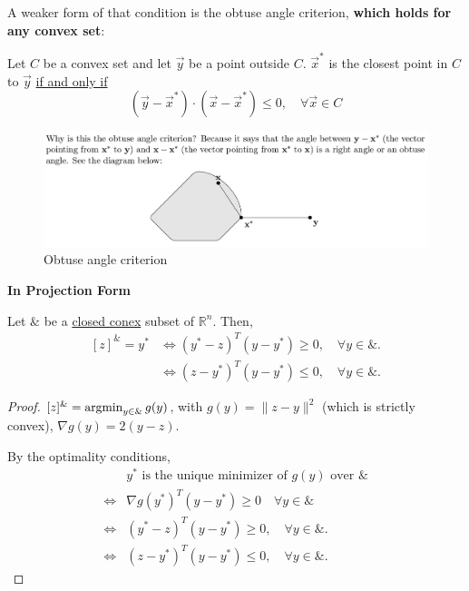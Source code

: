 \documentclass[11pt]{elegantbook}
\newcommand{\argmin}{\operatornamewithlimits{argmin}}
\begin{document}
A weaker form of that condition is the obtuse angle criterion, \textbf{which holds for any convex set}:
\begin{theorem}
    Let $C$ be a convex set and let $\vec{y}$ be a point outside $C$. $\vec{x}^*$ is the closest point in $C$ to $\vec{y}$ \underline{if and only if} $$(\vec{y}-\vec{x}^*)\cdot (\vec{x}-\vec{x}^*)\leq 0,\quad \forall \vec{x}\in C$$
\end{theorem}
\begin{center}\begin{figure}[htbp]
    \centering
    \includegraphics[scale=0.25]{obtuse.png}
    \caption{Obtuse angle criterion}
    \label{}
\end{figure}\end{center}
\textbf{In Projection Form}
\begin{proposition}
    Let $\&$ be a \underline{closed conex} subset of $\mathbb{R}^n$. Then,
    \begin{equation}
        \begin{aligned}
            [z]^\&=y^*
            &\Leftrightarrow (y^*-z)^T(y-y^*)\geq 0,\quad \forall y\in\&.\\
            &\Leftrightarrow (z-y^*)^T(y-y^*)\leq 0,\quad \forall y\in\&.
        \end{aligned}
        \nonumber
    \end{equation}
\end{proposition}
\begin{proof}
    $[z]^\& = \argmin_{y\in\&}g(y)$, with $g(y)=\|z-y\|^2$ (which is strictly convex), $\nabla g(y)=2(y-z)$.

    By the optimality conditions,
    \begin{equation}
        \begin{aligned}
            &y^*\text{ is the unique minimizer of $g(y)$ over $\&$}\\
            \Leftrightarrow	& \nabla g(y^*)^T(y-y^*)\geq 0\quad \forall y\in\&\\
            \Leftrightarrow & (y^*-z)^T(y-y^*)\geq 0,\quad \forall y\in\&.\\
            \Leftrightarrow &(z-y^*)^T(y-y^*)\leq 0,\quad \forall y\in\&.
        \end{aligned}
        \nonumber
    \end{equation}
\end{proof}
\end{document}
